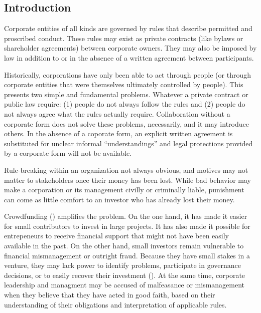 \documentclass[9pt,oneside]{amsart}
\begin{document}
\setlength{\columnsep}{20pt}
\begin{multicols}{2}

\section{Introduction}\label{sec:introduction}

Corporate entities of all kinds are governed by rules that describe permitted and proscribed conduct. These rules may exist as private contracts (like bylaws or shareholder agreements) between corporate owners. They may also be imposed by law in addition to or in the absence of a written agreement between participants.

Historically, corporations have only been able to act through people (or through corporate entities that were themselves ultimately controlled by people). This presents two simple and fundamental problems. Whatever a private contract or public law require:  (1) people do not always follow the rules and (2) people do not always agree what the rules actually require. Collaboration without a corporate form does not solve these problems, necessarily, and it may introduce others. In the absence of a coporate form, an explicit written agreement is substituted for unclear informal ``understandings'' and legal protections provided by a corporate form will not be available.

Rule-breaking within an organization not always obvious, and motives may not matter to stakeholders once their money has been lost. While bad behavior may make a corporation or its management civilly or criminally liable, punishment can come as little comfort to an investor who has already lost their money.  

Crowdfunding (\cite{2015CFReport}) amplifies the problem. On the one hand, it has made it easier for small contributors to invest in large projects. It has also made it possible for entrepeneurs to receive financial support that might not have been easily available in the past. On the other hand, small investors remain vulnerable to financial mismanagement or outright fraud. Because they have small stakes in a venture, they may lack power to identify problems, participate in governance decisions, or to easily recover their investment (\cite{9MostDisgracefulCrowdFundings, CrowdfundingFailTC}). At the same time, corporate leadership and managment may be accused of malfeasance or mismanagement when they believe that they have acted in good faith, based on their understanding of their obligations and interpretation of applicable rules.


\end{multicols}
\end{document}
